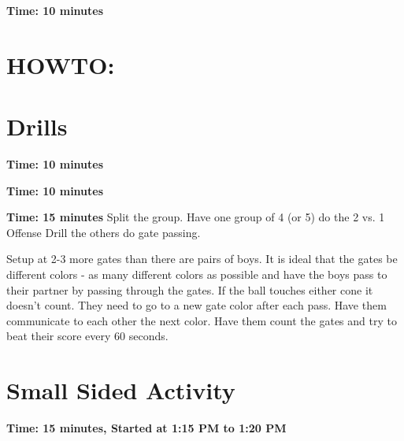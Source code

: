 \documentclass[10pt,letterpaper]{article}
\newenvironment{myalertblock}[1]{%
    \tcolorbox[beamer,%
    noparskip,breakable,
    colback=LightCoral,colframe=DarkRed,%
    colbacklower=Tomato!75!LightCoral,%
    title=#1]}%
    {\endtcolorbox}
\begin{document}
%
%

\textbf{Time: 10 minutes}


\section{HOWTO:}


\section{Drills}

\textbf{Time: 10 minutes}


\textbf{Time: 10 minutes}


\textbf{Time: 15 minutes}
Split the group.  Have one group of 4 (or 5) do the 2 vs. 1 Offense Drill the others do gate passing.  

\begin{myalertblock}{Gate Passing}
Setup at 2-3 more gates than there are pairs of boys.  It is ideal that the gates be different colors - as many different colors as possible and have the boys pass to their partner by passing through the gates.  If the ball touches either cone it doesn't count.  They need to go to a new gate color after each pass.  Have them communicate to each other the next color.  Have them count the gates and try to beat their score every 60 seconds.
\end{myalertblock}



\section{Small Sided Activity}
\textbf{Time: 15 minutes, Started at 1:15 PM to 1:20 PM}

\end{document}
